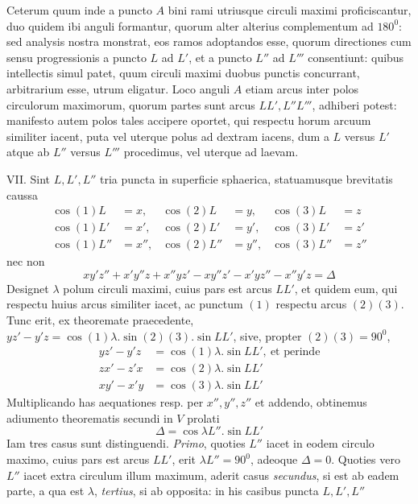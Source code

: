 %
\noindent Ceterum quum inde a puncto \(A\) bini rami utriusque circuli maximi proficiscantur, duo quidem ibi anguli formantur, quorum alter alterius complementum ad \(180^0\): sed analysis nostra monstrat, eos ramos adoptandos esse, quorum directiones cum sensu progressionis a puncto \(L\) ad \(L'\), et a puncto \(L''\) ad \(L'''\) consentiunt: quibus intellectis simul patet, quum circuli maximi duobus punctis concurrant, arbitrarium esse, utrum eligatur. Loco anguli \(A\) etiam arcus inter polos circulorum maximorum, quorum partes sunt arcus \(LL',L''L'''\), adhiberi potest: manifesto autem polos tales accipere oportet, qui respectu horum arcuum similiter iacent, puta vel uterque polus ad dextram iacens, dum a \(L\) versus \(L'\) atque ab \(L''\) versus \(L'''\) procedimus, vel uterque ad laevam.

VII. Sint \(L,L',L''\) tria puncta in superficie sphaerica, statuamusque brevitatis caussa
\[
\begin{aligned}
\cos(1)L&=x,&\cos(2)L&=y,&\cos(3)L&=z\\
\cos(1)L'&=x',&\cos(2)L'&=y',&\cos(3)L'&=z'\\
\cos(1)L''&=x'',&\cos(2)L''&=y'',&\cos(3)L''&=z''
\end{aligned}
\]
\noindent nec non
\[
xy'z''+x'y''z+x''yz'-xy''z'-x'yz''-x''y'z=\Delta
\]
\noindent Designet \(\lambda\) polum circuli maximi, cuius pars est arcus \(LL'\), et quidem eum, qui respectu huius arcus similiter iacet, ac punctum \((1)\) respectu arcus \((2)(3)\). Tunc erit, ex theoremate praecedente, \(yz'-y'z=\cos(1)\lambda\mathord{.}\sin(2)(3)\mathord{.}\sin LL'\), sive, propter \((2)(3)=90^0\),
\[
\begin{aligned}
yz'-y'z&=\cos(1)\lambda\mathord{.}\sin LL',\ \text{et perinde}\\
zx'-z'x&=\cos(2)\lambda\mathord{.}\sin LL'\\
xy'-x'y&=\cos(3)\lambda\mathord{.}\sin LL'
\end{aligned}
\]
\noindent Multiplicando has aequationes resp. per \(x'',y'',z''\) et addendo, obtinemus adiumento theorematis secundi in \(V\) prolati
\[
\Delta=\cos\lambda L''\mathord{.}\sin LL'
\]
\noindent Iam tres casus sunt distinguendi. \textit{Primo}, quoties \(L''\) iacet in eodem circulo maximo, cuius pars est arcus \(LL'\), erit \(\lambda L''=90^0\), adeoque \(\Delta=0\). Quoties vero \(L''\) iacet extra circulum illum maximum, aderit casus \textit{secundus}, si est ab eadem parte, a qua est \(\lambda\), \textit{tertius}, si ab opposita: in his casibus puncta \(L,L',L''\)

